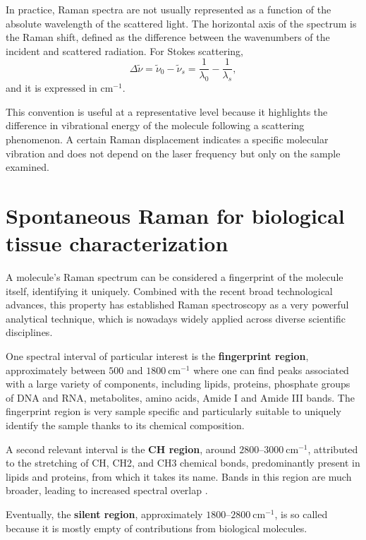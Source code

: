 In practice, Raman spectra are not usually represented as a function of the absolute wavelength of the scattered light. The horizontal axis of the spectrum is the Raman shift, defined as the difference between the wavenumbers of the incident and scattered radiation. For Stokes scattering,
\begin{equation}
    \Delta \tilde{\nu} =
    \tilde{\nu}_0 - \tilde{\nu}_s =
    \frac{1}{\lambda_0} - \frac{1}{\lambda_s},
    \label{eq:raman_shift}
\end{equation}
and it is expressed in \(\mathrm{cm}^{-1}\). 

This convention is useful at a representative level because it highlights the difference in vibrational energy of the molecule following a scattering phenomenon. A certain Raman displacement indicates a specific molecular vibration and does not depend on the laser frequency but only on the sample examined.


\section{Spontaneous Raman for biological tissue characterization} 
\label{sec:raman_biological_tissues}

A molecule’s Raman spectrum can be
considered a fingerprint of the molecule itself, identifying it uniquely. Combined with the
recent broad technological advances, this property has established Raman spectroscopy
as a very powerful analytical technique, which is nowadays widely applied across diverse
scientific disciplines.

One spectral interval of particular interest is the \textbf{fingerprint region}, approximately between \(500\) and \(1800~\mathrm{cm}^{-1}\) where one can find peaks associated with a large variety of components, including lipids, proteins, phosphate groups of DNA and RNA,
metabolites, amino acids, Amide I and Amide III bands. The fingerprint region is very
sample specific and particularly suitable to uniquely identify the sample thanks to its
chemical composition.

A second relevant interval is the \textbf{CH region}, around \(2800\)--\(3000~\mathrm{cm}^{-1}\), attributed to
the stretching of CH, CH2, and CH3 chemical bonds, predominantly present in lipids and proteins, from which it takes its name.
Bands in this region are much broader, leading to increased spectral overlap \cite{agrimi2025raman}.

Eventually, the \textbf{silent region}, approximately \(1800\)--\(2800~\mathrm{cm}^{-1}\), is so called because it is mostly empty of contributions from biological molecules.


